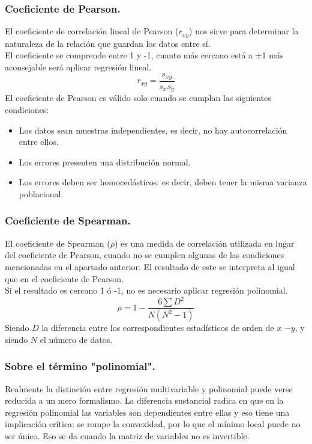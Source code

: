 \documentclass[a4paper,11pt]{article}
\begin{document}
\subsubsection{Coeficiente de Pearson.}

El coeficiente de correlación lineal de Pearson ($r_{xy}$) nos sirve para determinar la naturaleza de la relación que guardan los datos entre sí. \\

\noindent
El coeficiente se comprende entre 1 y -1, cuanto más cercano está a ±1 más aconsejable será aplicar regresión lineal.
\[
r_{xy}=\frac{s_{xy}}{s_x s_y}
\]
El coeficiente de Pearson es válido solo cuando se cumplan las siguientes condiciones:
\begin{itemize}
    \item Los datos sean muestras independientes, es decir, no hay autocorrelación entre ellos.
    \item Los errores presenten una distribución normal.
    \item Los errores deben ser homocedásticos: es decir, deben tener la misma
varianza poblacional.
\end{itemize}
\subsubsection{Coeficiente de Spearman.}

El coeficiente de Spearman ($\rho$) es una medida de correlación utilizada en lugar del coeficiente de Pearson, cuando no se cumplen algunas de las condiciones mencionadas en el apartado anterior. El resultado de este se interpreta al igual que en el coeficiente de Pearson. \\

\noindent
Si el resultado es cercano 1 ó -1, no es necesario aplicar regresión polinomial.
\[
\rho = 1 - \frac{6\sum D^2}{N(N^2 - 1)}
\]
Siendo $D$  la diferencia entre los correspondientes estadísticos de orden de $x$ $- y$, y siendo $N$ el número de datos.

\subsubsection{Sobre el término "polinomial".}

\indent
Realmente la distinción entre regresión multivariable y polinomial puede verse reducida a un mero formalismo. La diferencia sustancial radica en que en la regresión polinomial las variables son dependientes entre ellas y eso tiene una implicación crítica: se rompe la convexidad, por lo que el mínimo local puede no ser único. Eso se da cuando la matriz de variables no es invertible.
\end{document}

